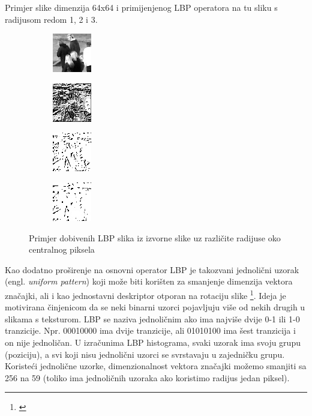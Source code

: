 \documentclass[times, utf8, zavrsni]{fer}
\begin{document}
Primjer slike dimenzija 64x64 i primijenjenog LBP operatora na tu 
sliku s radijusom redom 1, 2 i 3.

\begin{figure}[ht]
\begin{subfigure}[b]{0.24\linewidth}
\centering
\includegraphics{img/1.jpg}
\end{subfigure}
\begin{subfigure}[b]{0.24\linewidth}
\centering
\includegraphics{img/2.jpg}
\end{subfigure}
\begin{subfigure}[b]{0.24\linewidth}
\centering
\includegraphics{img/3.jpg}
\end{subfigure}
\begin{subfigure}[b]{0.24\linewidth}
\centering
\includegraphics{img/4.jpg}
\end{subfigure}

\caption{Primjer dobivenih LBP slika iz izvorne slike uz različite radijuse oko centralnog piksela}
\end{figure}

Kao dodatno proširenje na osnovni operator LBP je takozvani jednolični uzorak 
(engl. \textit{uniform pattern}) koji može biti korišten za smanjenje dimenzija
vektora značajki, ali i kao jednostavni deskriptor otporan na rotaciju slike 
\footnote{\cite{barkan}}. Ideja je motivirana činjenicom da se neki 
binarni uzorci pojavljuju više od nekih drugih u slikama s teksturom. 
LBP se naziva jednoličnim ako ima najviše dvije 0-1 ili 1-0 tranzicije.
 Npr. 00010000 ima dvije tranzicije, ali 01010100 ima šest tranzicija 
 i on nije jednoličan. U izračunima LBP histograma, svaki uzorak ima 
 svoju grupu (poziciju), a svi koji nisu jednolični uzorci se 
 svrstavaju u zajedničku grupu. Koristeći jednolične uzorke,
  dimenzionalnost vektora značajki možemo smanjiti sa 256 na 59 
  (toliko ima jednoličnih uzoraka ako koristimo radijus jedan piksel).
\end{document}
